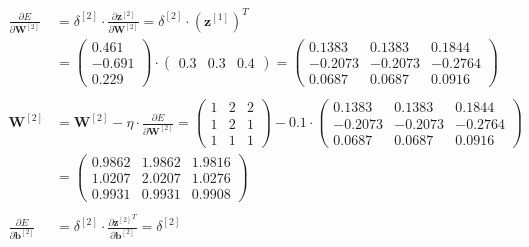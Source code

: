 \documentclass[12pt]{article}
\begin{document}
\begin{enumerate}
\begin{equation*}
    \begin{aligned}
        \\
        \frac{\partial E}{\partial \mathbf{W}^{[2]}} &= \delta^{[2]} \cdot \frac{\partial \mathbf{z}^{[2]}}{\partial \mathbf{W}^{[2]}} = \delta^{[2]} \cdot \left(\mathbf{z}^{[1]}\right)^T \\
        &= \begin{pmatrix}
            0.461 \\
            -0.691 \\
            0.229
        \end{pmatrix} \cdot \begin{pmatrix}
            0.3 & 0.3 & 0.4
        \end{pmatrix} = \begin{pmatrix}
            0.1383 & 0.1383 & 0.1844\\
            -0.2073 & -0.2073 & -0.2764\\
            0.0687 & 0.0687 & 0.0916
        \end{pmatrix}\\
        \\
        \mathbf{W}^{[2]} &= \mathbf{W}^{[2]} - \eta \cdot \frac{\partial E}{\partial \mathbf{W}^{[2]}} = \begin{pmatrix}
            1 & 2 & 2\\
            1 & 2 & 1\\
            1 & 1 & 1
        \end{pmatrix} - 0.1 \cdot \begin{pmatrix}
            0.1383 & 0.1383 & 0.1844\\
            -0.2073 & -0.2073 & -0.2764\\
            0.0687 & 0.0687 & 0.0916
        \end{pmatrix} \\ &= \begin{pmatrix}
            0.9862 & 1.9862 & 1.9816\\
            1.0207 & 2.0207 & 1.0276\\
            0.9931 & 0.9931 & 0.9908
        \end{pmatrix}\\
        \\
        \frac{\partial E}{\partial \mathbf{b}^{[2]}}&= \delta^{[2]} \cdot \frac{{\partial \mathbf{z}^{[2]}}^T}{\partial \mathbf{b}^{[2]}} = \delta^{[2]}\\
        \\

\end{aligned}
\end{equation*}
\end{enumerate}
\end{document}
